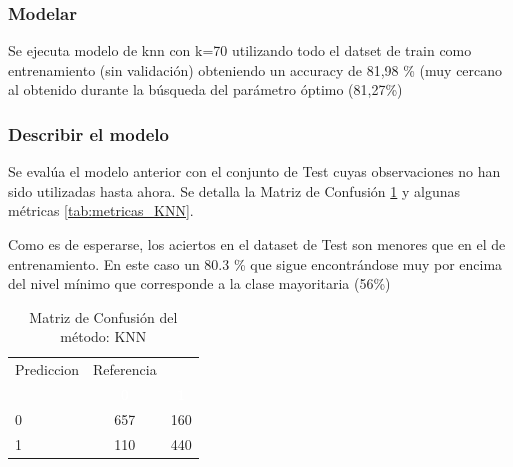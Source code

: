 \subsubsection{Modelar}

Se ejecuta modelo de knn con k=70 utilizando todo el datset de train como entrenamiento (sin validación) obteniendo un accuracy de 81,98 \% (muy cercano al obtenido durante la búsqueda del parámetro óptimo (81,27\%)

\subsubsection{Describir el modelo}

Se evalúa el modelo anterior con el conjunto de Test cuyas observaciones no han sido utilizadas hasta ahora. Se detalla la Matriz de Confusión \ref{tab:MatrizConf_KNN} y algunas métricas \ref{tab:metricas_KNN}.

Como es de esperarse, los aciertos en el dataset de Test son menores que en el de entrenamiento. En este caso un 80.3 \% que sigue encontrándose muy por encima del nivel mínimo que corresponde a la
clase mayoritaria (56\%)



\begin{table}[!h]
	
	\caption{\label{tab:MatrizConf_KNN}Matriz de Confusión del método: KNN }
	\centering
	\begin{tabular}[t]{lcc}
		\toprule
		\multicolumn{1}{c}{Prediccion} & \multicolumn{1}{c}{Referencia} & \multicolumn{1}{c}{ } \\
		\cmidrule(l{3pt}r{3pt}){1-1} \cmidrule(l{3pt}r{3pt}){2-2}
		\rowcolor{black}  \multicolumn{1}{c}{\textcolor{white}{\textbf{ }}} & \multicolumn{1}{c}{\textcolor{white}{\textbf{0}}} & \multicolumn{1}{c}{\textcolor{white}{\textbf{1}}}\\
		\midrule
		\rowcolor{gray!6}  0 & 657 & 160\\
		1 & 110 & 440\\
		\bottomrule
	\end{tabular}
\end{table}

